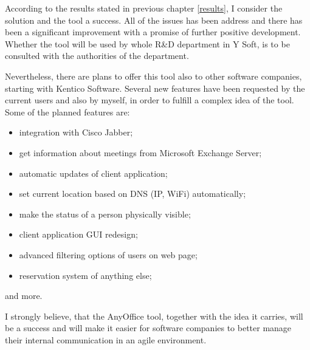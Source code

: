 \documentclass[11pt,singleside]{myfithesis2}
\begin{document}
According to the results stated in previous chapter \ref{results}, I consider the solution and the tool a success. All of the issues has been address and there has been a significant improvement with a promise of further positive development. Whether the tool will be used by whole R\&D department in Y Soft, is to be consulted with the authorities of the department.

Nevertheless, there are plans to offer this tool also to other software companies, starting with Kentico Software. Several new features have been requested by the current users and also by myself, in order to fulfill a complex idea of the tool. Some of the planned features are:
\begin{itemize}
	\item integration with Cisco Jabber;
	\item get information about meetings from Microsoft Exchange Server;
	\item automatic updates of client application;
	\item set current location based on DNS (IP, WiFi) automatically;
	\item make the status of a person physically visible;
	\item client application GUI redesign;
	\item advanced filtering options of users on web page;
	\item reservation system of anything else;
\end{itemize}
and more. 

I strongly believe, that the AnyOffice tool, together with the idea it carries, will be a success and will make it easier for software companies to better manage their internal communication in an agile environment.



\clearpage
{}
{}

\appendix
\end{document}
